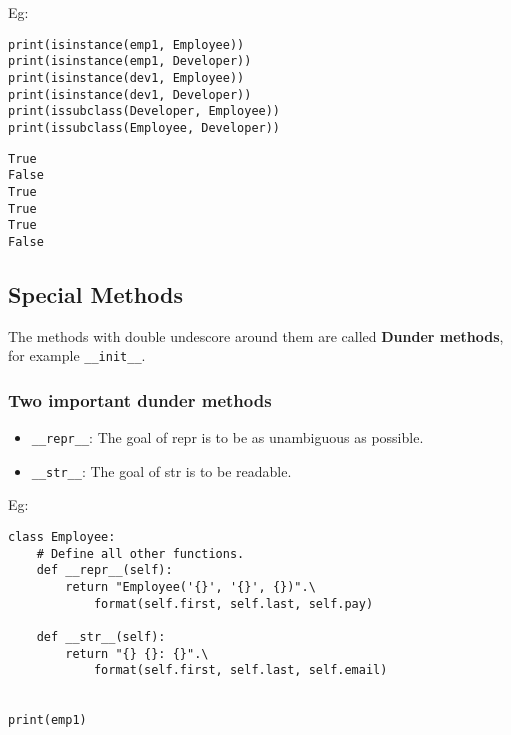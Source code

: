 Eg:\\

\begin{mdframed}[backgroundcolor=gray!10,linecolor=Firebrick4]
\begin{verbatim}
print(isinstance(emp1, Employee))
print(isinstance(emp1, Developer))
print(isinstance(dev1, Employee))
print(isinstance(dev1, Developer))
print(issubclass(Developer, Employee))
print(issubclass(Employee, Developer))
\end{verbatim}
\end{mdframed}

\begin{mdframed}[backgroundcolor=magenta!10,linecolor=magenta]
\begin{verbatim}
True
False
True
True
True
False
\end{verbatim}
\end{mdframed}

\subsection*{Special Methods}

The methods with double undescore around them are called \textbf{Dunder methods}, for example \texttt{\_\_init\_\_}.
\subsubsection*{Two important dunder methods}

\begin{itemize}
\item \texttt{\_\_repr\_\_}: The goal of repr is to be as unambiguous as possible.
\item \texttt{\_\_str\_\_}: The goal of str is to be readable.
\end{itemize}

Eg:\\

\begin{mdframed}[backgroundcolor=gray!10,linecolor=Firebrick4]
\begin{verbatim}
class Employee:
    # Define all other functions.
    def __repr__(self):
        return "Employee('{}', '{}', {})".\
            format(self.first, self.last, self.pay)
    
    def __str__(self):
        return "{} {}: {}".\
            format(self.first, self.last, self.email)
    

print(emp1)
\end{verbatim}
\end{mdframed}


